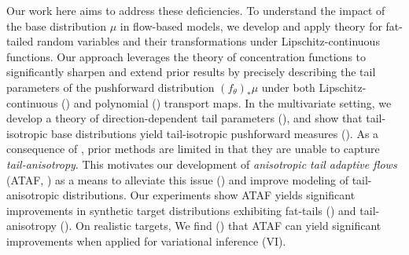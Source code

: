 \documentclass{article}
\theoremstyle{definition}
\theoremstyle{remark}
\begin{document}
Our work here aims to address these deficiencies.
To understand the impact of the base distribution $\mu$ in flow-based models,
we develop and apply theory for fat-tailed random variables and their transformations under Lipschitz-continuous functions.
Our approach leverages the theory of concentration functions \citep[Chapter 1.2]{ledoux2001concentration} to significantly sharpen and extend prior results
\citep[Theorem 4]{jaini2019sum} by precisely describing the tail parameters of the pushforward distribution $(f_\theta)_\ast \mu$ under both Lipschitz-continuous () and polynomial () transport maps.
In the multivariate setting,
we develop a theory of direction-dependent tail parameters (), and show that tail-isotropic base distributions yield tail-isotropic pushforward measures (). 
As a consequence of , prior methods \citep{jaini2020tails} are limited in that
they are unable to capture \emph{tail-anisotropy}.
This motivates our development of \emph{anisotropic tail adaptive flows} (ATAF, ) as a means to
alleviate this issue () and improve modeling of tail-anisotropic distributions.
Our experiments show ATAF yields significant improvements in synthetic target distributions exhibiting fat-tails () and tail-anisotropy ().
On realistic targets,
We find () that ATAF can yield significant improvements when applied for variational inference (VI).
\vspace{-3mm}
\end{document}
